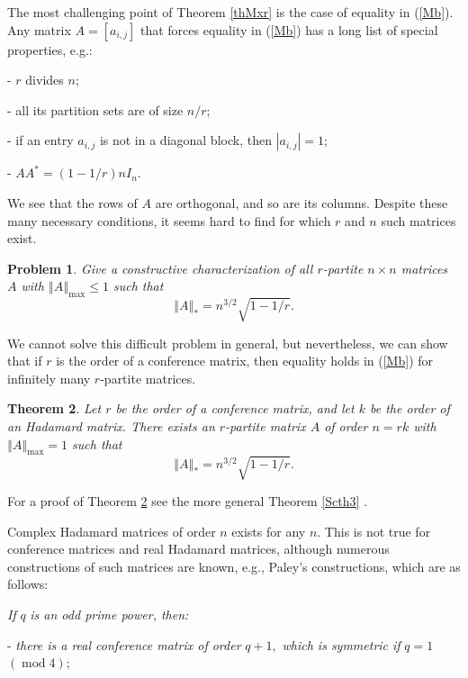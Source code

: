 \documentclass[12pt]{article}%
\newtheorem{theorem}{Theorem}[section]
\newtheorem{problem}[theorem]{Problem}
\begin{document}
The most challenging point of Theorem \ref{thMxr} is the case of equality in
(\ref{Mb}). Any matrix $A=\left[  a_{i,j}\right]  $ that forces equality in
(\ref{Mb}) has a long list of special properties, e.g.:

- $r$ divides $n;$

- all its partition sets are of size $n/r$;

- if an entry $a_{i,j}$ is not in a diagonal block, then $\left\vert
a_{i,j}\right\vert =1;$

- $AA^{\ast}=\left(  1-1/r\right)  nI_{n}.$

We see that the rows of $A$ are orthogonal, and so are its columns. Despite
these many necessary conditions, it seems hard to find for which $r$ and $n$
such matrices exist.

\begin{problem}
Give a constructive characterization of all $r$-partite $n\times n$ matrices
$A$ with $\left\Vert A\right\Vert _{\max}\leq1$ such that
\[
\left\Vert A\right\Vert _{\ast}=n^{3/2}\sqrt{1-1/r}.
\]

\end{problem}

We cannot solve this difficult problem in general, but nevertheless, we can
show that if $r$ is the order of a conference matrix, then equality holds in
(\ref{Mb}) for infinitely many $r$-partite matrices.

\begin{theorem}
\label{th3}Let $r$ be the order of a conference matrix, and let $k$ be the
order of an Hadamard matrix. There exists an $r$-partite matrix $A$ of order
$n=rk$ with $\left\Vert A\right\Vert _{\max}=1$ such that
\[
\left\Vert A\right\Vert _{\ast}=n^{3/2}\sqrt{1-1/r}.
\]

\end{theorem}

For a proof of Theorem \ref{th3} see the more general Theorem \ref{Scth3}%
.\medskip

Complex Hadamard matrices of order $n$ exists for any $n.$ This is not true
for conference matrices and real Hadamard matrices, although numerous
constructions of such matrices are known, e.g., Paley's constructions, which
are as follows:\medskip

\emph{If }$q$\emph{ is an odd prime power, then:}

- \emph{there is a real conference matrix of order }$q+1,$\emph{ which is
symmetric if }$q=1$\emph{ }$\left(  \operatorname{mod}4\right)  $;
\end{document}
